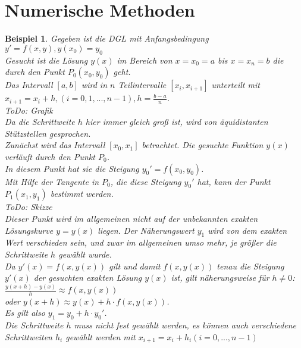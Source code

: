 \documentclass[fontset=ubuntu,12pt,a4paper]{scrreprt}
\newtheorem{beispiel}[defi]{Beispiel}
\begin{document}
 \section{Numerische Methoden}
 \begin{beispiel}
 	Gegeben ist die DGL mit Anfangsbedingung  \\
 	\(y'=f(x,y), y(x_0)=y_0\) \\
 	Gesucht ist die Lösung $y(x)$ im Bereich von $x=x_0=a$ bis $x=x_n=b$ die durch den Punkt $P_0(x_0,y_0)$ geht. \\
 	Das Intervall $\left[a,b\right]$ wird in $n$ Teilintervalle $\left[x_i,x_{i+1}\right]$ unterteilt mit $x_{i+1}=x_i+h, (i=0,1,...,n-1), h=\frac{b-a}{n}$.
 	\\ ToDo: Grafik \\
 	Da die Schrittweite $h$ hier immer gleich groß ist, wird von äquidistanten Stützstellen gesprochen. \\
 	Zunächst wird das Intervall $\left[x_0,x_1\right]$ betrachtet. Die gesuchte Funktion $y(x)$ verläuft durch den Punkt $P_0$. \\
 	In diesem Punkt hat sie die Steigung $y_0'=f(x_0,y_0)$.\\
 	Mit Hilfe der Tangente in $P_0$, die diese Steigung $y_0'$ hat, kann der Punkt $P_1(x_1,y_1)$ bestimmt werden. \\
 	ToDo: Skizze \\
 	Dieser Punkt wird im allgemeinen nicht auf der unbekannten exakten Lösungskurve $y=y(x)$ liegen. Der Näherungswert $y_1$ wird von dem exakten Wert verschieden sein, und zwar im allgemeinen umso mehr, je größer die Schrittweite $h$ gewählt wurde. \\
 	Da $y'(x)=f(x,y(x))$ gilt und damit $f(x,y(x))$ tenau die Steigung $y'(x)$ der gesuchten exakten Lösung $y(x)$ ist, gilt näherungsweise für $h\neq0$: $\frac{y(x+h)-y(x)}{h}\approx f(x,y(x))$ \\ oder $y(x+h)\approx y(x)+h\cdot f(x,y(x))$. \\ Es gilt also $y_1=y_0+h\cdot y_0'$. \\
 	Die Schrittweite $h$ muss nicht fest gewählt werden, es können auch verschiedene Schrittweiten $h_i$ gewählt werden mit $x_{i+1}=x_i+h_i (i=0,...,n-1)$
 \end{beispiel}
\end{document}
